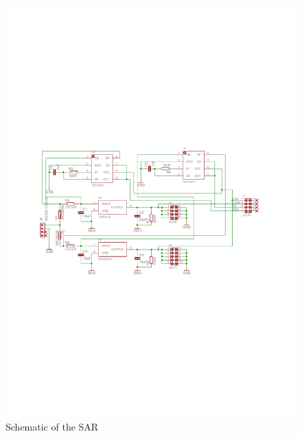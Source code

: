 \begin{figure}[H]
\centering
\includegraphics[width=\textwidth]{figures/fig_Schematic_SAR}
\caption{Schematic of the \acl{SAR}}
\label{fig:SAR_Schematic}
\end{figure}
%
%
